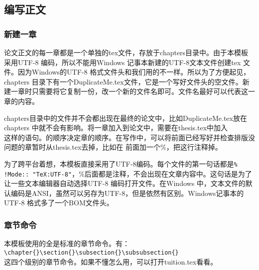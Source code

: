 \subsection{编写正文}
\subsubsection{新建一章}
论文正文的每一章都是一个单独的tex文件，存放于chapters目录中。由于本模板采用UTF-8 编码，所以不能用Windows 记事本新建的UTF-8文本文件创建tex 文件。因为Windows的UTF-8 格式文件头和我们用的不一样。所以为了方便起见，chapters 目录下有一个DuplicateMe.tex文件，它是一个写好文件头的空文件。新建一章时只需要将它复制一份，改一个新的文件名即可。文件名最好可以代表这一章的内容。

chapters目录中的文件并不会都出现在最终的论文中，比如DuplicateMe.tex放在chapters 中就不会有影响。将一章加入到论文中，需要在thesis.tex中加入\\
\verb||这样的语句。\verb||的顺序决定章的顺序。在写作中，可以将前面已经写好并检查排版没问题的章暂时从thesis.tex去掉，比如在\verb|| 前面加一个\%，把这行注释掉。

为了跨平台着想，本模板直接采用了UTF-8编码。每个文件的第一句话都是\verb|% !Mode:: "TeX:UTF-8"|，\%后面都是注释，不会出现在文章内容中。这句话是为了让一些文本编辑器自动选择UTF-8 编码打开文件。在Windows 中，文本文件的默认编码是ANSI，虽然可以另存为UTF-8，但是依然有区别。Windows记事本的UTF-8 格式多了一个BOM文件头。

\subsubsection{章节命令}
本模板使用的全是标准的章节命令。有：\\
\verb|\chapter{}\section{}\subsection{}\subsubsection{}|\\
这四个级别的章节命令。如果不懂怎么用，可以打开tuition.tex看看。

